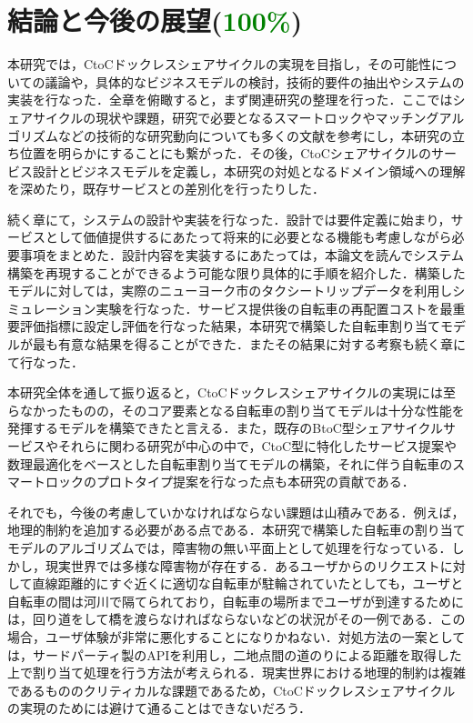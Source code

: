 \section{結論と今後の展望(\textcolor{green}{100\%})}
  \label{sec:結論と今後の展望}  
    \par 本研究では，CtoCドックレスシェアサイクルの実現を目指し，その可能性についての議論や，具体的なビジネスモデルの検討，技術的要件の抽出やシステムの実装を行なった．全章を俯瞰すると，まず関連研究の整理を行った．ここではシェアサイクルの現状や課題，研究で必要となるスマートロックやマッチングアルゴリズムなどの技術的な研究動向についても多くの文献を参考にし，本研究の立ち位置を明らかにすることにも繋がった．その後，CtoCシェアサイクルのサービス設計とビジネスモデルを定義し，本研究の対処となるドメイン領域への理解を深めたり，既存サービスとの差別化を行ったりした．
    \par 続く章にて，システムの設計や実装を行なった．設計では要件定義に始まり，サービスとして価値提供するにあたって将来的に必要となる機能も考慮しながら必要事項をまとめた．設計内容を実装するにあたっては，本論文を読んでシステム構築を再現することができるよう可能な限り具体的に手順を紹介した．構築したモデルに対しては，実際のニューヨーク市のタクシートリップデータを利用しシミュレーション実験を行なった．サービス提供後の自転車の再配置コストを最重要評価指標に設定し評価を行なった結果，本研究で構築した自転車割り当てモデルが最も有意な結果を得ることができた．またその結果に対する考察も続く章にて行なった．
    \par 本研究全体を通して振り返ると，CtoCドックレスシェアサイクルの実現には至らなかったものの，そのコア要素となる自転車の割り当てモデルは十分な性能を発揮するモデルを構築できたと言える．また，既存のBtoC型シェアサイクルサービスやそれらに関わる研究が中心の中で，CtoC型に特化したサービス提案や数理最適化をベースとした自転車割り当てモデルの構築，それに伴う自転車のスマートロックのプロトタイプ提案を行なった点も本研究の貢献である．
    \par それでも，今後の考慮していかなければならない課題は山積みである．例えば，地理的制約を追加する必要がある点である．本研究で構築した自転車の割り当てモデルのアルゴリズムでは，障害物の無い平面上として処理を行なっている．しかし，現実世界では多様な障害物が存在する．あるユーザからのリクエストに対して直線距離的にすぐ近くに適切な自転車が駐輪されていたとしても，ユーザと自転車の間は河川で隔てられており，自転車の場所までユーザが到達するためには，回り道をして橋を渡らなければならないなどの状況がその一例である．この場合，ユーザ体験が非常に悪化することになりかねない．対処方法の一案としては，サードパーティ製のAPIを利用し，二地点間の道のりによる距離を取得した上で割り当て処理を行う方法が考えられる．現実世界における地理的制約は複雑であるもののクリティカルな課題であるため，CtoCドックレスシェアサイクルの実現のためには避けて通ることはできないだろう．
